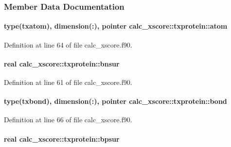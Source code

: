 \subsubsection{Member Data Documentation}
\hypertarget{structcalc__xscore_1_1txprotein_a2a6da467746d70566519b497e0c7576f}{
\paragraph[{atom}]{\setlength{\rightskip}{0pt plus 5cm}type({\bf txatom}), dimension(\-:), pointer calc\-\_\-xscore\-::txprotein\-::atom}}\label{structcalc__xscore_1_1txprotein_a2a6da467746d70566519b497e0c7576f}


Definition at line 64 of file calc\-\_\-xscore.\-f90.

\hypertarget{structcalc__xscore_1_1txprotein_ad65f9841c16ab580f2e865f54263137f}{
\paragraph[{bnsur}]{\setlength{\rightskip}{0pt plus 5cm}real calc\-\_\-xscore\-::txprotein\-::bnsur}}\label{structcalc__xscore_1_1txprotein_ad65f9841c16ab580f2e865f54263137f}


Definition at line 61 of file calc\-\_\-xscore.\-f90.

\hypertarget{structcalc__xscore_1_1txprotein_a03749ea875270563dda039b0170603fd}{
\paragraph[{bond}]{\setlength{\rightskip}{0pt plus 5cm}type({\bf txbond}), dimension(\-:), pointer calc\-\_\-xscore\-::txprotein\-::bond}}\label{structcalc__xscore_1_1txprotein_a03749ea875270563dda039b0170603fd}


Definition at line 66 of file calc\-\_\-xscore.\-f90.

\hypertarget{structcalc__xscore_1_1txprotein_a4c235b4396ab53ee1f0748503cea6952}{
\paragraph[{bpsur}]{\setlength{\rightskip}{0pt plus 5cm}real calc\-\_\-xscore\-::txprotein\-::bpsur}}\label{structcalc__xscore_1_1txprotein_a4c235b4396ab53ee1f0748503cea6952}


